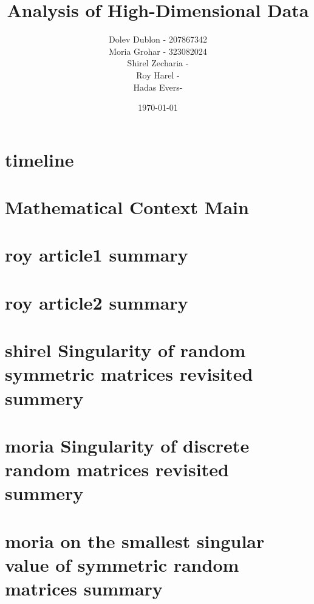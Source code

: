 \documentclass[12pt]{article}
\title{\textbf{Analysis of High-Dimensional Data}}
\author{
    Dolev Dublon - 207867342\\
    Moria Grohar - 323082024\\ 
    Shirel Zecharia - \\
    Roy Harel - \\
    Hadas Evers-
}
\date{\today}
\begin{document}
\maketitle


\tableofcontents

\newpage





\section{timeline}



\section{Mathematical Context Main}



\section{roy article1 summary}



\section{roy article2 summary}



\section{shirel Singularity of random symmetric matrices revisited summery}



\section{moria Singularity of discrete random matrices revisited summery}



\section{moria on the smallest singular value of symmetric random matrices summary}
\end{document}
